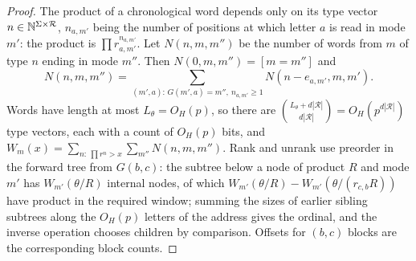 \begin{proof}
The product of a chronological word depends only on its type vector
$n\in\mathbb N^{\Sigma\times\mathcal R}$, $n_{a,m'}$ being the number of positions at which
letter $a$ is read in mode $m'$: the product is $\prod r_{a,m'}^{n_{a,m'}}$. Let
$N(n,m,m'')$ be the number of words from $m$ of type $n$ ending in mode $m''$. Then
$N(0,m,m'')=[m=m'']$ and
\[
N(n,m,m'')=\sum_{(m',a):\,G(m',a)=m'',\ n_{a,m'}\ge1}N(n-e_{a,m'},m,m').
\]
Words have length at most $L_\theta=O_H(p)$, so there are
$\binom{L_\theta+d|\mathcal R|}{d|\mathcal R|}=O_H(p^{d|\mathcal R|})$ type vectors, each
with a count of $O_H(p)$ bits, and
$W_m(x)=\sum_{n:\ \prod r^{n}>x}\sum_{m''}N(n,m,m'')$. Rank and unrank use preorder in the
forward tree from $G(b,c)$: the subtree below a node of product $R$ and mode $m'$ has
$W_{m'}(\theta/R)$ internal nodes, of which $W_{m'}(\theta/R)-W_{m'}(\theta/(r_{c,b}R))$
have product in the required window; summing the sizes of earlier sibling subtrees along
the $O_H(p)$ letters of the address gives the ordinal, and the inverse operation chooses
children by comparison. Offsets for $(b,c)$ blocks are the corresponding block counts.
\end{proof}

